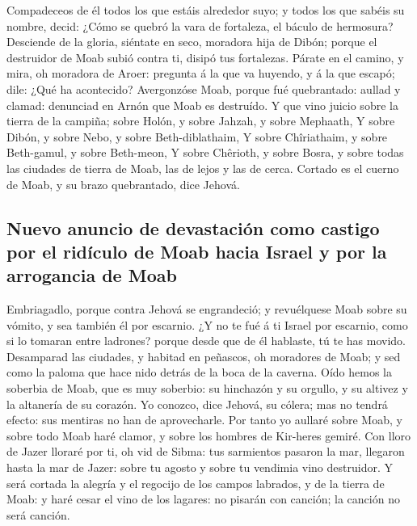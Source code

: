  Compadeceos de él todos los que estáis alrededor suyo; y
todos los que sabéis su nombre, decid: ¿Cómo se quebró la vara de
fortaleza, el báculo de hermosura?  Desciende de la
gloria, siéntate en seco, moradora hija de Dibón; porque el destruidor
de Moab subió contra ti, disipó tus fortalezas.  Párate
en el camino, y mira, oh moradora de Aroer: pregunta á la que va
huyendo, y á la que escapó; dile: ¿Qué ha acontecido? 
Avergonzóse Moab, porque fué quebrantado: aullad y clamad: denunciad en
Arnón que Moab es destruído.  Y que vino juicio sobre la
tierra de la campiña; sobre Holón, y sobre Jahzah, y sobre Mephaath,
 Y sobre Dibón, y sobre Nebo, y sobre Beth-diblathaim,
 Y sobre Chîriathaim, y sobre Beth-gamul, y sobre
Beth-meon,  Y sobre Chêrioth, y sobre Bosra, y sobre
todas las ciudades de tierra de Moab, las de lejos y las de cerca.
 Cortado es el cuerno de Moab, y su brazo quebrantado,
dice Jehová.

\hypertarget{nuevo-anuncio-de-devastaciuxf3n-como-castigo-por-el-riduxedculo-de-moab-hacia-israel-y-por-la-arrogancia-de-moab}{%
\subsection{Nuevo anuncio de devastación como castigo por el ridículo de
Moab hacia Israel y por la arrogancia de
Moab}\label{nuevo-anuncio-de-devastaciuxf3n-como-castigo-por-el-riduxedculo-de-moab-hacia-israel-y-por-la-arrogancia-de-moab}}

 Embriagadlo, porque contra Jehová se engrandeció; y
revuélquese Moab sobre su vómito, y sea también él por escarnio.
 ¿Y no te fué á ti Israel por escarnio, como si lo
tomaran entre ladrones? porque desde que de él hablaste, tú te has
movido.  Desamparad las ciudades, y habitad en peñascos,
oh moradores de Moab; y sed como la paloma que hace nido detrás de la
boca de la caverna.  Oído hemos la soberbia de Moab, que
es muy soberbio: su hinchazón y su orgullo, y su altivez y la altanería
de su corazón.  Yo conozco, dice Jehová, su cólera; mas
no tendrá efecto: sus mentiras no han de aprovecharle. 
Por tanto yo aullaré sobre Moab, y sobre todo Moab haré clamor, y sobre
los hombres de Kir-heres gemiré.  Con lloro de Jazer
lloraré por ti, oh vid de Sibma: tus sarmientos pasaron la mar, llegaron
hasta la mar de Jazer: sobre tu agosto y sobre tu vendimia vino
destruidor.  Y será cortada la alegría y el regocijo de
los campos labrados, y de la tierra de Moab: y haré cesar el vino de los
lagares: no pisarán con canción; la canción no será canción.

